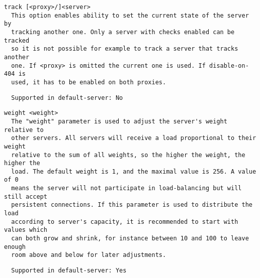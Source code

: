 \begin{verbatim}
track [<proxy>/]<server>
  This option enables ability to set the current state of the server by
  tracking another one. Only a server with checks enabled can be tracked
  so it is not possible for example to track a server that tracks another
  one. If <proxy> is omitted the current one is used. If disable-on-404 is
  used, it has to be enabled on both proxies.
\end{verbatim}

\begin{verbatim}
  Supported in default-server: No
\end{verbatim}

\begin{verbatim}
weight <weight>
  The "weight" parameter is used to adjust the server's weight relative to
  other servers. All servers will receive a load proportional to their weight
  relative to the sum of all weights, so the higher the weight, the higher the
  load. The default weight is 1, and the maximal value is 256. A value of 0
  means the server will not participate in load-balancing but will still accept
  persistent connections. If this parameter is used to distribute the load
  according to server's capacity, it is recommended to start with values which
  can both grow and shrink, for instance between 10 and 100 to leave enough
  room above and below for later adjustments.
\end{verbatim}

\begin{verbatim}
  Supported in default-server: Yes
\end{verbatim}

